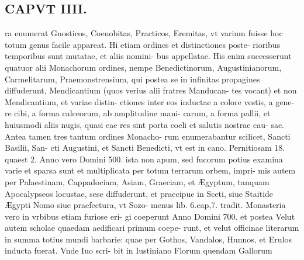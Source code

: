 \documentclass{article}
\begin{document}
\begin{pages}
\section*{CAPVT  IIII. }
\marginpar{[ p.219 ]}\pstart ra enumerat Gnosticos, Coenobitas, Practicos, Eremitas, vt varium fuisse hoc totum genus facile appareat. Hi etiam ordines et distinctiones poste- rioribus temporibus sunt mutatae, et aliis nomini- bus appellatae. His enim successerunt quatuor alii Monachorum ordines, nempe Benedictinorum, Augustinianorum, Carmelitarum, Praemonstrensium, qui postea se in infinitas propagines diffuderunt, Mendicantium (quos verius alii fratres Manducan- tes vocant) et non Mendicantium, et variae distin- ctiones inter eos inductae a colore vestis, a gene- re cibi, a forma calceorum, ab amplitudine mani- carum, a forma pallii, et huiusmodi aliis nugis, quasi eae res sint porta coeli et salutis nostrae cau- sae. Antea tamen tres tantum ordines Monacho- rum enumerabantur scilicet, Sancti Basilii, San- cti Augustini, et Sancti Benedicti, vt est in cano. Pernitiosam 18. quaest 2. Anno vero Domini 500. ista non apum, sed fucorum potius examina varie et sparsa sunt et multiplicata per totum terrarum orbem, impri- mis autem per Palaestinam, Cappadociam, Asiam, Graeciam, et Ægyptum, tanquam Apocalypseos locustae, sese diffuderunt, et praecipue in Sceti, siue Staitide Ægypti Nomo siue praefectura, vt Sozo- menus lib. 6.cap,7. tradit. Monasteria vero in vrbibus etiam furiose eri- gi coeperunt Anno Domini 700. et postea Velut autem scholae quaedam aedificari primum coepe- runt, et velut officinae literarum in summa totius mundi barbarie: quae per Gothos, Vandalos, Hunnos, et Erulos inducta fuerat. Vnde Iuo scri- bit in Iustiniano Florum quendam Gallorum  \pend

\end{pages}
\end{document}
